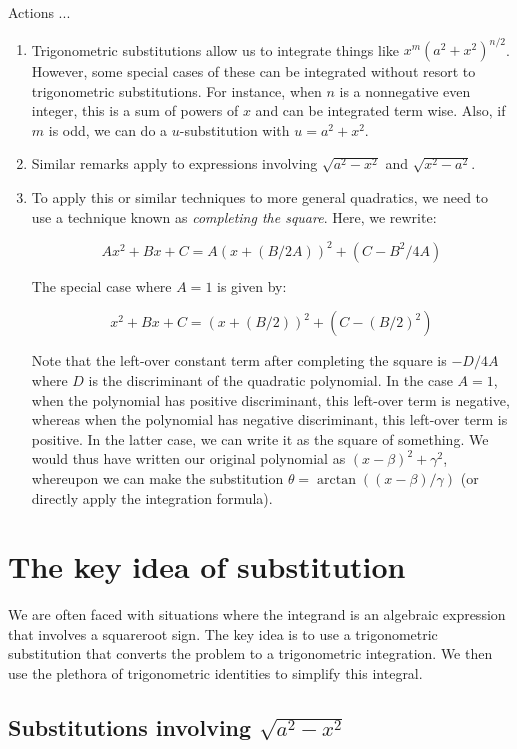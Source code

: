 \documentclass[10pt]{amsart}
\begin{document}
Actions ...

\begin{enumerate}
\item Trigonometric substitutions allow us to integrate things like
  $x^m(a^2 + x^2)^{n/2}$. However, some special cases of these can be
  integrated without resort to trigonometric substitutions. For
  instance, when $n$ is a nonnegative even integer, this is a sum of
  powers of $x$ and can be integrated term wise. Also, if $m$ is odd,
  we can do a $u$-substitution with $u = a^2 + x^2$.
\item Similar remarks apply to expressions involving $\sqrt{a^2 -
  x^2}$ and $\sqrt{x^2 - a^2}$.
\item To apply this or similar techniques to more general quadratics,
  we need to use a technique known as {\em completing the
  square}. Here, we rewrite:

  $$Ax^2 + Bx + C = A(x + (B/2A))^2 + (C - B^2/4A)$$

  The special case where $A = 1$ is given by:

  $$x^2 + Bx + C = (x + (B/2))^2 + (C - (B/2)^2)$$

  Note that the left-over constant term after completing the square is
  $-D/4A$ where $D$ is the discriminant of the quadratic
  polynomial. In the case $A = 1$, when the polynomial has positive
  discriminant, this left-over term is negative, whereas when the
  polynomial has negative discriminant, this left-over term is
  positive. In the latter case, we can write it as the square of
  something. We would thus have written our original polynomial as $(x
  - \beta)^2 + \gamma^2$, whereupon we can make the substitution
  $\theta = \arctan((x - \beta)/\gamma)$ (or directly apply the
  integration formula).
\end{enumerate}

\section{The key idea of substitution}

We are often faced with situations where the integrand is an algebraic
expression that involves a squareroot sign. The key idea is to use a
trigonometric substitution that converts the problem to a
trigonometric integration. We then use the plethora of trigonometric
identities to simplify this integral.

\subsection{Substitutions involving $\sqrt{a^2 - x^2}$}
\end{document}

